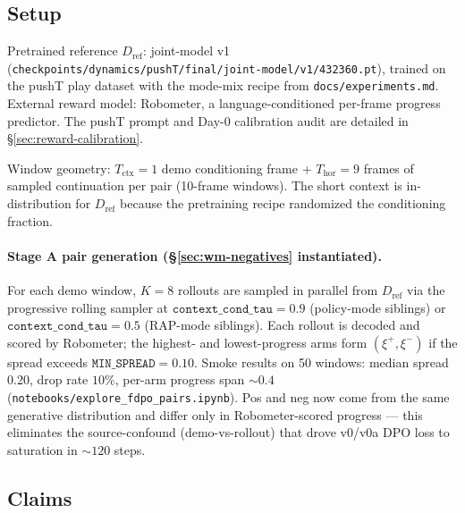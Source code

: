 \documentclass[11pt]{article}
\newcommand{\Dref}{D_{\mathrm{ref}}}
\begin{document}
\subsection{Setup}
\label{sec:setup}

Pretrained reference $\Dref$: joint-model v1 (\texttt{checkpoints/dynamics/pushT/final/joint-model/v1/432360.pt}), trained on the pushT play dataset with the mode-mix recipe from \texttt{docs/experiments.md}. External reward model: Robometer, a language-conditioned per-frame progress predictor. The pushT prompt and Day-0 calibration audit are detailed in \S\ref{sec:reward-calibration}.

Window geometry: $T_{\mathrm{ctx}} = 1$ demo conditioning frame + $T_{\mathrm{hor}} = 9$ frames of sampled continuation per pair (10-frame windows). The short context is in-distribution for $\Dref$ because the pretraining recipe randomized the conditioning fraction.

\paragraph{Stage A pair generation (\S\ref{sec:wm-negatives} instantiated).}
For each demo window, $K=8$ rollouts are sampled in parallel from $\Dref$ via the progressive rolling sampler at $\texttt{context\_cond\_tau}=0.9$ (policy-mode siblings) or $\texttt{context\_cond\_tau}=0.5$ (RAP-mode siblings). Each rollout is decoded and scored by Robometer; the highest- and lowest-progress arms form $(\xi^+, \xi^-)$ if the spread exceeds $\texttt{MIN\_SPREAD}=0.10$. Smoke results on 50 windows: median spread $0.20$, drop rate $10\%$, per-arm progress span $\sim 0.4$ (\texttt{notebooks/explore\_fdpo\_pairs.ipynb}). Pos and neg now come from the same generative distribution and differ only in Robometer-scored progress --- this eliminates the source-confound (demo-vs-rollout) that drove v0/v0a DPO loss to saturation in $\sim 120$ steps.

\subsection{Claims}
\label{sec:claims}
\end{document}
